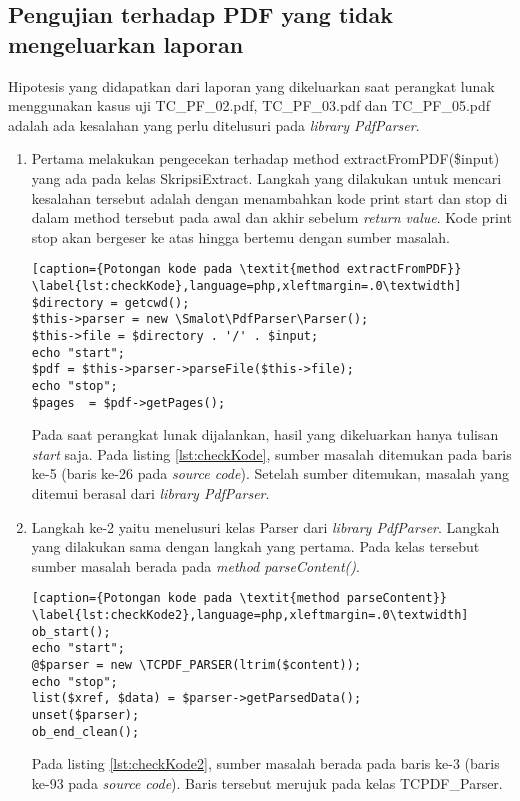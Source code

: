 \subsection{Pengujian terhadap PDF yang tidak mengeluarkan laporan}
\label{kosong}
Hipotesis yang didapatkan dari laporan yang dikeluarkan saat perangkat lunak menggunakan kasus uji TC\_PF\_02.pdf, TC\_PF\_03.pdf dan TC\_PF\_05.pdf adalah ada kesalahan yang perlu ditelusuri pada \textit{library PdfParser}.

\begin{enumerate}
	\item Pertama melakukan pengecekan terhadap method extractFromPDF(\$input) yang ada pada kelas SkripsiExtract. Langkah yang dilakukan untuk mencari kesalahan tersebut adalah dengan menambahkan kode print start dan stop di dalam method tersebut pada awal dan akhir sebelum \textit{return value}. Kode print stop akan bergeser ke atas hingga bertemu dengan sumber masalah. 
	
\begin{lstlisting}[caption={Potongan kode pada \textit{method extractFromPDF}}	\label{lst:checkKode},language=php,xleftmargin=.0\textwidth]
$directory = getcwd();
$this->parser = new \Smalot\PdfParser\Parser();
$this->file = $directory . '/' . $input;
echo "start";
$pdf = $this->parser->parseFile($this->file);
echo "stop";
$pages  = $pdf->getPages();
\end{lstlisting}

Pada saat perangkat lunak dijalankan, hasil yang dikeluarkan hanya tulisan \textit{start} saja. Pada listing \ref{lst:checkKode}, sumber masalah ditemukan pada baris ke-5 (baris ke-26 pada \textit{source code}). Setelah sumber ditemukan, masalah yang ditemui berasal dari \textit{library PdfParser}.
	
	\item Langkah ke-2 yaitu menelusuri kelas Parser dari \textit{library PdfParser}. Langkah yang dilakukan sama dengan langkah yang pertama. Pada kelas tersebut sumber masalah berada pada \textit{method parseContent()}.
	
\begin{lstlisting}[caption={Potongan kode pada \textit{method parseContent}}	\label{lst:checkKode2},language=php,xleftmargin=.0\textwidth]
ob_start();
echo "start";
@$parser = new \TCPDF_PARSER(ltrim($content));
echo "stop";
list($xref, $data) = $parser->getParsedData();
unset($parser);
ob_end_clean();
\end{lstlisting}
	
	Pada listing \ref{lst:checkKode2}, sumber masalah berada pada baris ke-3 (baris ke-93 pada \textit{source code}). Baris tersebut merujuk pada kelas TCPDF\_Parser.	
	

\end{enumerate}
